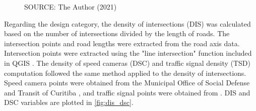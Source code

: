 \begin{figure}[!htbp]
\begin{subfigure}{0.5\textwidth}
    \end{subfigure}    
    \label{fig:pd_ldi}
    \par SOURCE: The Author (2021)
\end{figure}

Regarding the design category, the density of intersections (DIS) was calculated based on the number of intersections divided by the length of roads. The intersection points and road lengths were extracted from the \textcite{IPPUC2021} road axis data. Intersection points were extracted using the "line intersection" function included in QGIS \cite{QGIS_software}. The density of speed cameras (DSC) and traffic signal density (TSD) computation followed the same method applied to the density of intersections. Speed camera points were obtained from the Municipal Office of Social Defense and Transit of Curitiba \cite{SETRAN2020}, and traffic signal points were obtained from \textcite{IPPUC2021}. DIS and DSC variables are plotted in \autoref{fig:dis_dsc}. 

